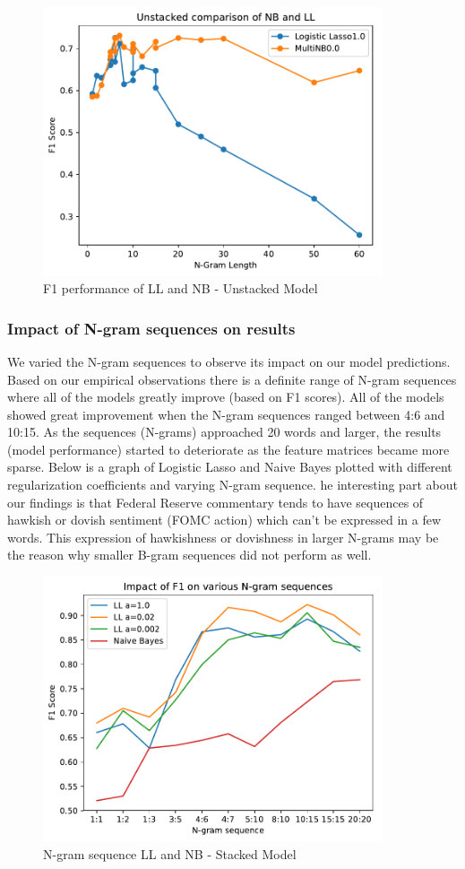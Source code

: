\documentclass[11pt]{article}
\newcommand{\vertSpace}[1]{\vspace{3mm}}
\begin{document}
{\begin{figure}[h!]
  \centering
  \includegraphics[width=100mm]{./ngramlen_nb_ll.pdf}
  \caption{F1 performance of LL and NB - Unstacked Model}
\end{figure}

\subsubsection{Impact of N-gram sequences on results}
We varied the N-gram sequences to observe its impact on our model predictions.  Based on our empirical observations there is a definite range of N-gram sequences where all of the models greatly improve (based on F1 scores).  All of the models showed great improvement when the N-gram sequences ranged between 4:6 and 10:15.  As the sequences (N-grams) approached 20 words and larger, the results (model performance) started to deteriorate as the feature matrices became more sparse.  Below is a graph of Logistic Lasso and Naive Bayes plotted with different regularization coefficients and varying N-gram sequence.  \vertSpace


The interesting part about our findings is that Federal Reserve commentary tends to have sequences of hawkish or dovish sentiment (FOMC action) which can't be expressed in a few words.  This expression of hawkishness or dovishness in larger N-grams may be the reason why smaller B-gram sequences did not perform as well.
\begin{figure}[h!]
  \centering
  \includegraphics[width=100mm]{./ngram_seq.pdf}
  \caption{N-gram sequence LL and NB - Stacked Model}
\end{figure}
\vfill

}
\end{document}
